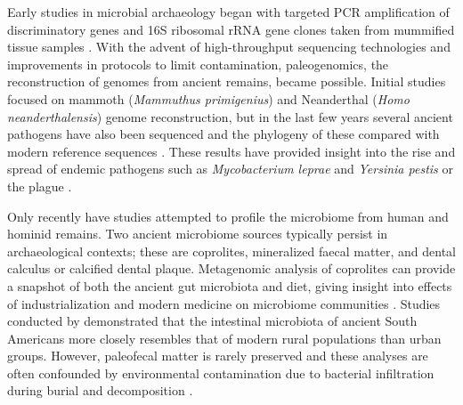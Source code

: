\documentclass[12pt, a4paper]{article}
\begin{document}
Early studies in microbial archaeology began with targeted PCR amplification of discriminatory genes \cite{Spigelman:1993,SALO:1994aa,Drancourt:1998aa} and 16S ribosomal rRNA gene clones taken from mummified tissue samples \cite{Cano:2000aa}.
With the advent of high-throughput sequencing technologies and improvements in protocols to limit contamination, paleogenomics, the reconstruction of genomes from ancient remains, became possible. 
Initial studies focused on mammoth (\textit{Mammuthus primigenius})  \cite{Poinar:2006aa} and Neanderthal (\textit{Homo neanderthalensis}) \cite{Green:2006aa} genome reconstruction, but in the last few years several ancient pathogens have also been sequenced and the phylogeny of these compared with modern reference sequences \cite{Schuenemann:2013aa,Kay:2014aa,Wagner:2014aa,Lugli:2017aa}.
These results have provided insight into the rise and spread of endemic pathogens such as \textit{Mycobacterium leprae} \cite{Schuenemann:2013aa} and \textit{Yersinia pestis} or the plague \cite{Wagner:2014aa}.

Only recently have studies attempted to profile the microbiome from human and hominid remains. 
Two ancient microbiome sources typically persist in archaeological contexts; these are coprolites, mineralized faecal matter, and dental calculus or calcified dental plaque.
Metagenomic analysis of coprolites can provide a snapshot of both the ancient gut microbiota and diet, giving insight into effects of industrialization and modern medicine on microbiome communities \cite{Tito:2008aa}. 
Studies conducted by  demonstrated that the intestinal microbiota of ancient South Americans more closely resembles that of modern rural populations than urban groups. 
However, paleofecal matter is rarely preserved and these analyses are often confounded by environmental contamination due to bacterial infiltration during burial and decomposition \cite{Tito:2012aa}.  
\end{document}
